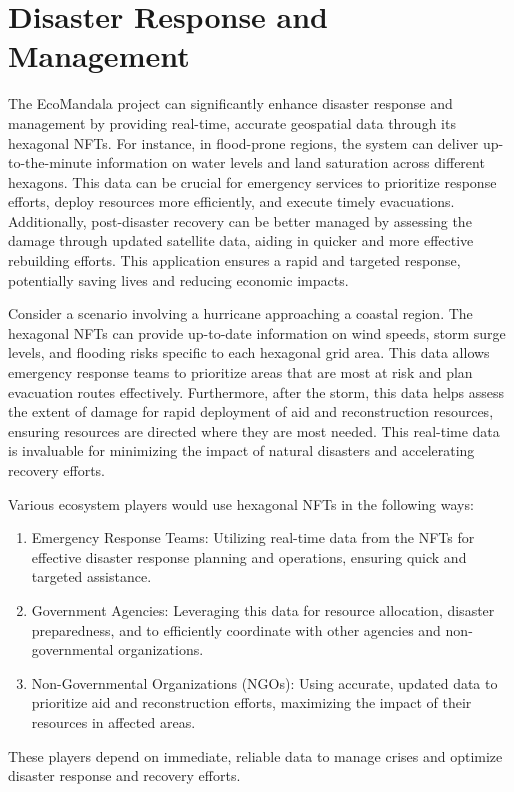 \documentclass{scrreport}
\begin{document}
\section{Disaster Response and Management}
The EcoMandala project can significantly enhance disaster response and management by providing real-time, accurate geospatial data through its hexagonal NFTs. For instance, in flood-prone regions, the system can deliver up-to-the-minute information on water levels and land saturation across different hexagons. This data can be crucial for emergency services to prioritize response efforts, deploy resources more efficiently, and execute timely evacuations. Additionally, post-disaster recovery can be better managed by assessing the damage through updated satellite data, aiding in quicker and more effective rebuilding efforts. This application ensures a rapid and targeted response, potentially saving lives and reducing economic impacts.

Consider a scenario involving a hurricane approaching a coastal region. The hexagonal NFTs can provide up-to-date information on wind speeds, storm surge levels, and flooding risks specific to each hexagonal grid area. This data allows emergency response teams to prioritize areas that are most at risk and plan evacuation routes effectively. Furthermore, after the storm, this data helps assess the extent of damage for rapid deployment of aid and reconstruction resources, ensuring resources are directed where they are most needed. This real-time data is invaluable for minimizing the impact of natural disasters and accelerating recovery efforts.

Various ecosystem players would use hexagonal NFTs in the following ways:
\begin{enumerate}
    \item Emergency Response Teams: Utilizing real-time data from the NFTs for effective disaster response planning and operations, ensuring quick and targeted assistance.
    \item Government Agencies: Leveraging this data for resource allocation, disaster preparedness, and to efficiently coordinate with other agencies and non-governmental organizations.
    \item Non-Governmental Organizations (NGOs): Using accurate, updated data to prioritize aid and reconstruction efforts, maximizing the impact of their resources in affected areas.
\end{enumerate}

These players depend on immediate, reliable data to manage crises and optimize disaster response and recovery efforts.
\end{document}
